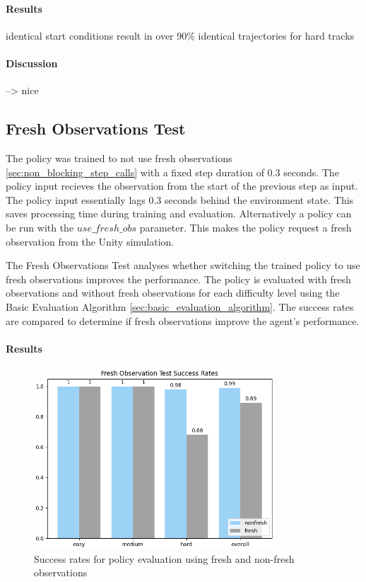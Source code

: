\paragraph{Results}

identical start conditions result in over 90\% identical trajectories for hard tracks

\paragraph{Discussion}

--> nice


\subsection{Fresh Observations Test}

The policy was trained to not use fresh observations \ref{sec:non_blocking_step_calls} with a fixed step duration of 0.3 seconds. The policy input recieves the observation from the start of the previous step as input. The policy input essentially lags 0.3 seconds behind the environment state. This saves processing time during training and evaluation. Alternatively a policy can be run with the $use\_fresh\_obs$ parameter. This makes the policy request a fresh observation from the Unity simulation.

The Fresh Observations Test analyses whether switching the trained policy to use fresh observations improves the performance. The policy is evaluated with fresh observations and without fresh observations for each difficulty level using the Basic Evaluation Algorithm \ref{sec:basic_evaluation_algorithm}. The success rates are compared to determine if fresh observations improve the agent's performance.

\paragraph{Results}

\begin{figure}
    \centering
    \includegraphics[width=0.8\textwidth]{Bilder/notebook_images/hardDistanceMixedLight_eval_freshNonFresh_success_rates_barplot.png}
    \caption{Success rates for policy evaluation using fresh and non-fresh observations}
    \label{fig:fresh_observations_test_result}
\end{figure}


